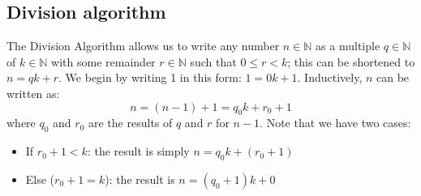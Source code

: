 \subsection{Division algorithm}
The Division Algorithm allows us to write any number \(n \in \mathbb N\) as a multiple \(q\in\mathbb N\) of \(k\in \mathbb N\) with some remainder \(r\in\mathbb N\) such that \(0 \leq r < k\); this can be shortened to \(n = qk + r\).
We begin by writing 1 in this form: \(1 = 0k + 1\).
Inductively, \(n\) can be written as:
\[
	n = (n-1) + 1 = q_0 k + r_0 + 1
\]
where \(q_0\) and \(r_0\) are the results of \(q\) and \(r\) for \(n-1\).
Note that we have two cases:
\begin{itemize}
	\item If \(r_0 + 1 < k\): the result is simply \(n = q_0k + (r_0+1)\)
	\item Else (\(r_0 + 1 = k\)): the result is \(n = (q_0 + 1)k + 0\)
\end{itemize}

